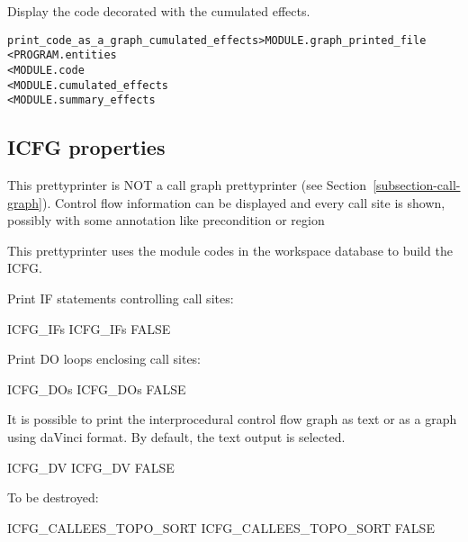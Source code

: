 \documentclass[a4paper]{report}
\newenvironment{PipsMake}{\begin{alltt}}{\end{alltt}}
\newenvironment{PipsPass}[1]{\label{pass:#1}}{}
\begin{document}
\begin{PipsPass}{print_code_as_a_graph_cumulated_effects}
Display the code decorated with the cumulated effects.
\end{PipsPass}

\begin{PipsMake}
print_code_as_a_graph_cumulated_effects    > MODULE.graph_printed_file
        < PROGRAM.entities
        < MODULE.code
        < MODULE.cumulated_effects
        < MODULE.summary_effects
\end{PipsMake}

\subsection{ICFG properties}

\label{subsection-interprocedural-control-flow-graph}

This prettyprinter is NOT a call graph prettyprinter (see
Section~\ref{subsection-call-graph}). Control flow information can be
displayed and every call site is shown, possibly with some annotation like
precondition or region

This prettyprinter uses the module codes in the workspace database to
build the ICFG.

Print IF statements controlling call sites:

\begin{PipsProp}{ICFG_IFs}
ICFG_IFs FALSE
\end{PipsProp}

Print DO loops enclosing call sites:

\begin{PipsProp}{ICFG_DOs}
ICFG_DOs FALSE
\end{PipsProp}

It is possible to print the interprocedural control flow graph as text or
as a graph using daVinci format. By default, the text output is selected.

\begin{PipsProp}{ICFG_DV}
ICFG_DV FALSE
\end{PipsProp}

To be destroyed:

\begin{PipsProp}{ICFG_CALLEES_TOPO_SORT}
ICFG_CALLEES_TOPO_SORT FALSE
\end{PipsProp}
\end{document}
